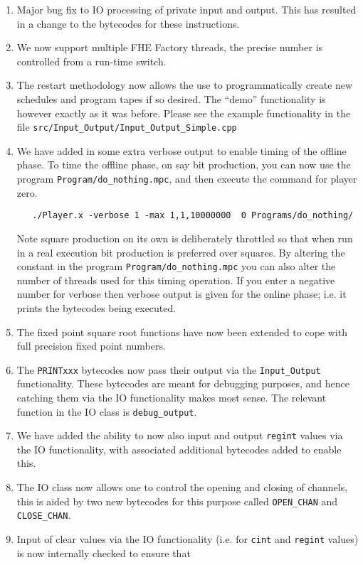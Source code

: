 \begin{enumerate}
\item Major bug fix to IO processing of private input and output.
This has resulted in a change to the bytecodes for these instructions.
\item We now support multiple FHE Factory threads, the precise number
is controlled from a run-time switch.
\item The restart methodology now allows the use to programmatically
create new schedules and program tapes if so desired. The
``demo'' functionality is however exactly as it was before.
Please see the example functionality in the file
\verb+src/Input_Output/Input_Output_Simple.cpp+
\item We have added in some extra verbose output to enable timing of the
offline phase. To time the offline phase, on say bit production,
you can now use the program \verb+Program/do_nothing.mpc+, and then
execute the command for player zero.
\begin{verbatim}
   ./Player.x -verbose 1 -max 1,1,10000000  0 Programs/do_nothing/
\end{verbatim}
Note square production on its own is deliberately throttled
so that when run in a real execution bit production is preferred
over squares.
By altering the constant in the program  \verb+Program/do_nothing.mpc+
you can also alter the number of threads used for this timing operation.
If you enter a negative number for verbose then verbose output
is given for the online phase; i.e. it prints the bytecodes being
executed.
\item The fixed point square root functions have now been extended to
cope with full precision fixed point numbers.
\item The \verb+PRINTxxx+ bytecodes now pass their output via the
\verb+Input_Output+ functionality. These bytecodes are meant for
debugging purposes, and hence catching them via the IO functionality
makes most sense. The relevant function in the IO class
is \verb+debug_output+.
\item We have added the ability to now also input and output \verb+regint+
values via the IO functionality, with associated additional bytecodes
added to enable this.
\item The IO class now allows one to control the opening and closing of
channels, this is aided by two new bytecodes for this purpose
called \verb+OPEN_CHAN+ and \verb+CLOSE_CHAN+.
\item Input of clear values via the IO functionality (i.e.
for \verb+cint+ and \verb+regint+ values) is now internally checked to ensure that

\end{enumerate}
